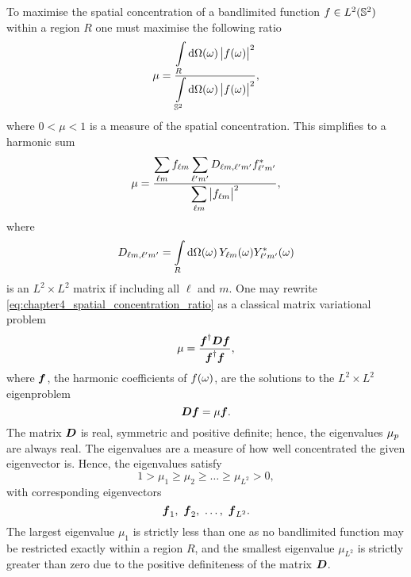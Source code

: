 To maximise the spatial concentration of a bandlimited function \(f \in \hilbert{\twoSphere}\) within a region \(R\) one must maximise the following ratio
%
\begin{equation}
	\mu
	= \frac{\integrateRegion{\sphereVolume} \abs{\pixel{f}}^{2}}{\integrateSphere{\omega} \abs{\pixel{f}}^{2}},
\end{equation}
%
where \(0 < \mu < 1\) is a measure of the spatial concentration.
This simplifies to a harmonic sum
%
\begin{equation}\label{eq:chapter4_spatial_concentration_ratio}
	\mu
	= \frac{\harmonicSum \harmonic{f} \harmonicSum['] \Dmatrix \conj{\harmonic[']{f}}}{\harmonicSum \abs{\harmonic{f}}^{2}},
\end{equation}
%
where
%
\begin{equation}\label{eq:chapter4_d_matrix}
	\Dmatrix
	= \integrateRegion{\sphereVolume} \pixel{\harmonic{Y}} \pixel{\conj{\harmonic[']{Y}}}
\end{equation}
%
is an \(L^{2} \times{} L^{2}\) matrix if including all \(\ell{}\) and \(m\).
One may rewrite \cref{eq:chapter4_spatial_concentration_ratio} as a classical matrix variational problem
%
\begin{equation}
	\mu
	= \frac{\hermitian{\vb*{f}} \vb*{D} \vb*{f}}{\hermitian{\vb*{f}}\vb*{f}},
\end{equation}
%
where \(\vb*{f}\), the harmonic coefficients of \(\pixel{f}\), are the solutions to the \(L^{2} \times{} L^{2}\) eigenproblem
%
\begin{equation}\label{eq:chapter4_eigenproblem}
	\vb*{D}\vb*{f}
	= \mu\vb*{f}.
\end{equation}
%
The matrix \(\vb*{D}\) is real, symmetric and positive definite; hence, the eigenvalues \(\slepian{\mu}\) are always real.
The eigenvalues are a measure of how well concentrated the given eigenvector is.
Hence, the eigenvalues satisfy
%
\begin{equation}
	1 > \mu_{1} \geq \mu_{2} \geq \ldots \geq \mu_{L^{2}} > 0, %
\end{equation}
%
with corresponding eigenvectors
%
\begin{equation}
	\vb*{f}_{1},\ \vb*{f}_{2},\ \ldots,\ \vb*{f}_{L^{2}}.
\end{equation}
%
The largest eigenvalue \(\mu_{1}\) is strictly less than one as no bandlimited function may be restricted exactly within a region \(R\), and the smallest eigenvalue \(\mu_{L^{2}}\) is strictly greater than zero due to the positive definiteness of the matrix \(\vb*{D}\).
